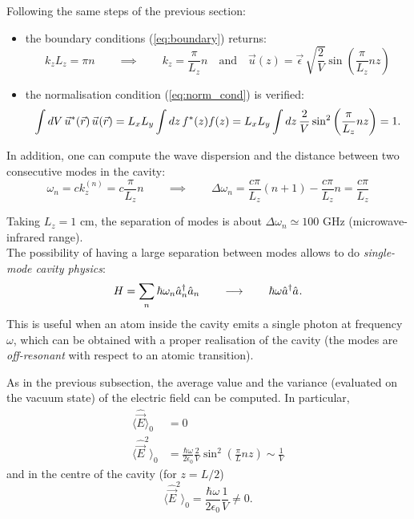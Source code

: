 Following the same steps of the previous section:
\begin{itemize}
    \item the boundary conditions (\ref{eq:boundary}) returns: 
    \begin{equation*}
        k_z L_z = \pi n \qquad \implies \qquad k_z =\frac{\pi}{L_z}n \quad \text{and} \quad \vec{u}(z) = \vec{\epsilon} \, \sqrt{\frac{2}{V}} \sin{\left( \frac{\pi}{L_z} n z \right)}
    \end{equation*}
    \item the normalisation condition (\ref{eq:norm_cond}) is verified:
    \begin{equation*}
        \int dV \, \vec{u}_{}^{\ast}(\vec{r}) \, \vec{u}_{}(\vec{r}) = L_x L_y \int dz \, f^{*}(z) f(z) = L_x L_y \int dz \, \frac{2}{V} \sin^2{\left(\frac{\pi}{L_z} n z \right)} = 1.
    \end{equation*}
\end{itemize}
In addition, one can compute the wave dispersion and the distance between two consecutive modes in the cavity:
\begin{equation*}
    \omega_n = c k_z^{(n)} = c \frac{\pi}{L_z}n \qquad \implies \qquad \Delta \omega_n = \frac{c \pi}{L_z}(n+1) - \frac{c \pi}{L_z}n = \frac{c \pi}{L_z}
\end{equation*}

\begin{tcolorbox} 
Taking $L_z = 1$ cm, the separation of modes is about $\Delta \omega_n \simeq  100 $ GHz (microwave-infrared range). \\
The possibility of having a large separation between modes allows to do \textit{single-mode cavity physics}:
\begin{equation*}
    H = \sum\limits_n \hbar \omega_n \hat{a}^{\dagger}_{n}\hat{a}_{n} \qquad  \longrightarrow \qquad  \hbar\omega \hat{a}^{\dagger}_{} \hat{a}_{}. 
\end{equation*}
This is useful when an atom inside the cavity emits a single photon at frequency $\omega$, which can be obtained with a proper realisation of the cavity (the modes are \textit{off-resonant} with respect to an atomic transition). 
\end{tcolorbox}

As in the previous subsection, the average value and the variance (evaluated on the vacuum state) of the electric field can be computed. In particular, 
\begin{align*}
    \langle \hat{\vec{E}} \rangle_0 &= 0 \\ 
   \langle \hat{\vec{E}}^2 \rangle_0 &= \frac{\hbar \omega}{2 \epsilon_0} \frac{2}{V} \sin^2\left(\frac{\pi}{L}n z\right) \sim \frac{1}{V}
\end{align*}
and in the centre of the cavity (for $z = L/2$)
$$\langle \hat{\vec{E}}^2 \rangle_0 = \frac{\hbar \omega}{2 \epsilon_0} \frac{1}{V} \neq 0.$$

